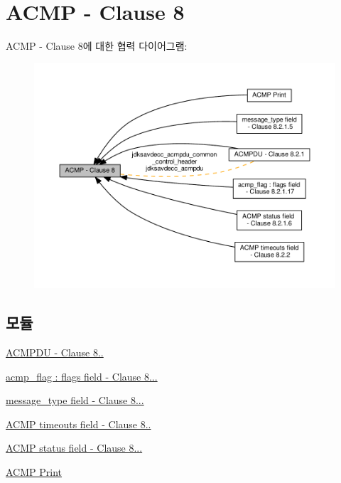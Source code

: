 \hypertarget{group__acmp}{}\section{A\+C\+MP -\/ Clause 8}
\label{group__acmp}
A\+C\+MP -\/ Clause 8에 대한 협력 다이어그램\+:
\nopagebreak
\begin{figure}[H]
\begin{center}
\leavevmode
\includegraphics[width=350pt]{group__acmp}
\end{center}
\end{figure}
\subsection*{모듈}
\begin{DoxyCompactItemize}
\item 
\hyperlink{group__acmpdu}{A\+C\+M\+P\+D\+U -\/ Clause 8..}
\item 
\hyperlink{group__acmp__flag}{acmp\+\_\+flag \+: flags field -\/ Clause 8...}
\item 
\hyperlink{group__acmp__message__type}{message\+\_\+type field -\/ Clause 8...}
\item 
\hyperlink{group__acmp__timeouts}{A\+C\+M\+P timeouts field -\/ Clause 8..}
\item 
\hyperlink{group__acmp__status}{A\+C\+M\+P status field -\/ Clause 8...}
\item 
\hyperlink{group__acmp__print}{A\+C\+M\+P Print}
\end{DoxyCompactItemize}
